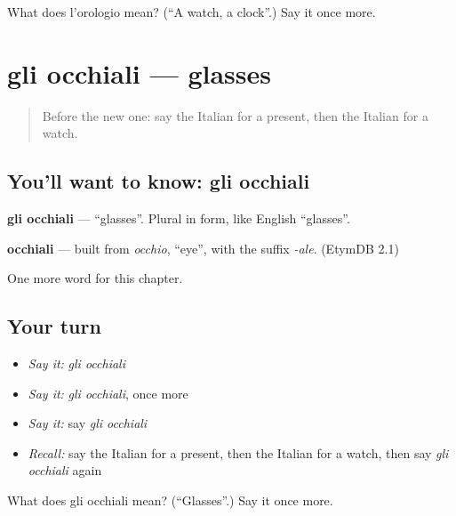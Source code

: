 \begin{tcolorbox}[breakable,colback=teal!4,colframe=teal!35!black,title={Before you move on}]
What does l'orologio mean? (\textquotedblleft{}A watch, a clock\textquotedblright{}.) Say it once more.
\end{tcolorbox}
\section[gli occhiali]{gli occhiali — glasses}

\label{lesson:IT-C63-occhiali}



\begin{quote}
Before the new one: say the Italian for a present, then the Italian for a watch.
\end{quote}

\subsection*{You'll want to know: gli occhiali}
\textbf{gli occhiali} — \textquotedblleft{}glasses\textquotedblright{}. Plural in form, like English \textquotedblleft{}glasses\textquotedblright{}.

\begin{cousinweb}
\textbf{occhiali} — built from \emph{occhio}, \textquotedblleft{}eye\textquotedblright{}, with the suffix \emph{-ale}. (EtymDB 2.1)
\end{cousinweb}

\begin{grammarlens}[title={What you've built}]
One more word for this chapter.
\end{grammarlens}

\subsection*{Your turn}
\begin{itemize}
\raggedright
  \item \emph{Say it:} \emph{gli occhiali}
  \item \emph{Say it:} \emph{gli occhiali}, once more
  \item \emph{Say it:} say \emph{gli occhiali}
  \item \emph{Recall:} say the Italian for a present, then the Italian for a watch, then say \emph{gli occhiali} again
\end{itemize}

\begin{tcolorbox}[breakable,colback=teal!4,colframe=teal!35!black,title={Before you move on}]
What does gli occhiali mean? (\textquotedblleft{}Glasses\textquotedblright{}.) Say it once more.
\end{tcolorbox}

